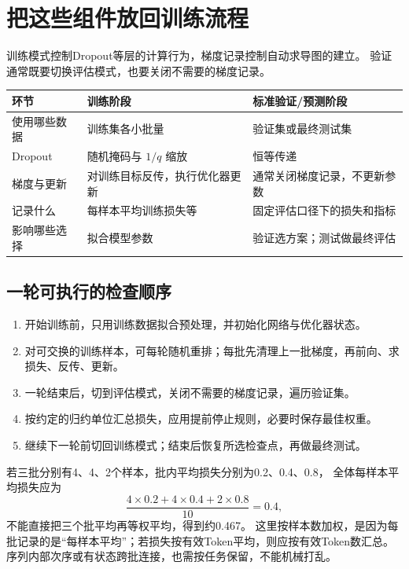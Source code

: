 \section{把这些组件放回训练流程}
\label{sec:train-workflow}

训练模式控制Dropout等层的计算行为，梯度记录控制自动求导图的建立。
验证通常既要切换评估模式，也要关闭不需要的梯度记录。

\begin{center}
\small
\renewcommand{\arraystretch}{1.4}
\begin{tabularx}{\textwidth}{P{30mm}Y Y}
\toprule
环节 & 训练阶段 & 标准验证/预测阶段\\
\midrule
使用哪些数据 & 训练集各小批量 & 验证集或最终测试集\\
Dropout & 随机掩码与 $1/q$ 缩放 & 恒等传递\\
梯度与更新 & 对训练目标反传，执行优化器更新 & 通常关闭梯度记录，不更新参数\\
记录什么 & 每样本平均训练损失等 & 固定评估口径下的损失和指标\\
影响哪些选择 & 拟合模型参数 & 验证选方案；测试做最终评估\\
\bottomrule
\end{tabularx}
\end{center}

\subsection{一轮可执行的检查顺序}
\begin{enumerate}
 \item 开始训练前，只用训练数据拟合预处理，并初始化网络与优化器状态。
 \item 对可交换的训练样本，可每轮随机重排；每批先清理上一批梯度，再前向、求损失、反传、更新。
 \item 一轮结束后，切到评估模式，关闭不需要的梯度记录，遍历验证集。
 \item 按约定的归约单位汇总损失，应用提前停止规则，必要时保存最佳权重。
 \item 继续下一轮前切回训练模式；结束后恢复所选检查点，再做最终测试。
\end{enumerate}

若三批分别有4、4、2个样本，批内平均损失分别为0.2、0.4、0.8，
全体每样本平均损失应为
\[
 \frac{4\times0.2+4\times0.4+2\times0.8}{10}=0.4,
\]
不能直接把三个批平均再等权平均，得到约0.467。
这里按样本数加权，是因为每批记录的是“每样本平均”；若损失按有效Token平均，则应按有效Token数汇总。
序列内部次序或有状态跨批连接，也需按任务保留，不能机械打乱。

